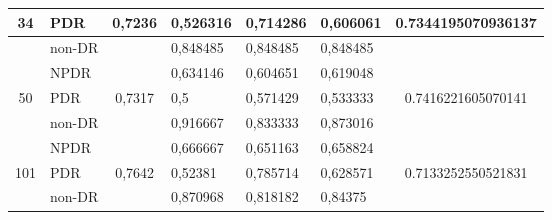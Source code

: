 \begin{table}[hbtp]
\begin{center}
\begin{tabular}{|c|l|c|l|l|l|c|}
            \multirow{-3}{*}{34}  & PDR                                                & \multirow{-3}{*}{0,7236} & 0,526316                                          & 0,714286                                         & 0,606061                                        & \multirow{-3}{*}{0.7344195070936137} \\ \hline
                                  & non-DR                                             &                          & 0,848485                                          & 0,848485                                         & 0,848485                                        &                                      \\ \cline{2-2} \cline{4-6}
                                  & NPDR                                               &                          & 0,634146                                          & 0,604651                                         & 0,619048                                        &                                      \\ \cline{2-2} \cline{4-6}
            \multirow{-3}{*}{50}  & PDR                                                & \multirow{-3}{*}{0,7317} & 0,5                                               & 0,571429                                         & 0,533333                                        & \multirow{-3}{*}{0.7416221605070141} \\ \hline
                                  & non-DR                                             &                          & 0,916667                                          & 0,833333                                         & 0,873016                                        &                                      \\ \cline{2-2} \cline{4-6}
                                  & NPDR                                               &                          & 0,666667                                          & 0,651163                                         & 0,658824                                        &                                      \\ \cline{2-2} \cline{4-6}
            \multirow{-3}{*}{101} & PDR                                                & \multirow{-3}{*}{0,7642} & 0,52381                                           & 0,785714                                         & 0,628571                                        & \multirow{-3}{*}{0.7133252550521831} \\ \hline
                                  & non-DR                                             &                          & 0,870968                                          & 0,818182                                         & 0,84375                                         &                                      \\ \cline{2-2} \cline{4-6}

\end{tabular}
\end{center}
\end{table}
